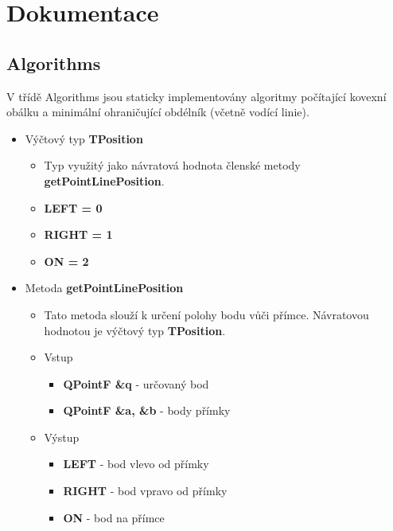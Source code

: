 \documentclass[a4paper, 12pt]{article}
\begin{document}
\clearpage



\section{Dokumentace}

\subsection{Algorithms}
V třídě Algorithms jsou staticky implementovány algoritmy počítající kovexní obálku a minimální ohraničující obdélník (včetně vodící linie).

\begin{itemize}

	\item Výčtový typ \textbf{TPosition}
		\begin{itemize}
			\item Typ využitý jako návratová hodnota členské metody \textbf{getPointLinePosition}.
			\item \textbf{LEFT = 0}
			\item \textbf{RIGHT = 1}
			\item \textbf{ON = 2}
		\end{itemize}

	\item Metoda \textbf{getPointLinePosition}
		\begin{itemize}
			\item Tato metoda slouží k určení polohy bodu vůči přímce. Návratovou hodnotou je výčtový typ \textbf{TPosition}.
			\item Vstup
				\begin{itemize}
					\item \textbf{QPointF \&q} - určovaný bod
					\item \textbf{QPointF \&a, \&b} - body přímky
				\end{itemize}
			\item Výstup
				\begin{itemize}
					\item \textbf{LEFT} - bod vlevo od přímky
					\item \textbf{RIGHT} - bod vpravo od přímky
					\item \textbf{ON} - bod na přímce
				\end{itemize}

		\end{itemize}


\end{itemize}
\end{document}
